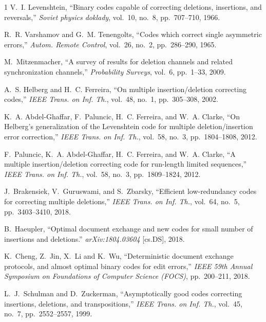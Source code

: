 \documentclass[10pt,a4paper,onecolumn]{IEEEtran}
\newcommand{\1}{\mathbbold{1}}
\begin{document}

\begin{thebibliography}{1}
V.~I. Levenshtein, ``Binary codes capable of correcting deletions, insertions, and reversals,'' \emph{Soviet physics doklady}, vol.~10, no.~8, pp.~707--710, 1966.

R.~R. Varshamov and G.~M. Tenengolts, ``Codes which correct single asymmetric errors,'' \emph{Autom. Remote Control}, vol.~26, no.~2, pp.~286--290, 1965.

M.~Mitzenmacher, ``A survey of results for deletion channels and related synchronization channels,'' \emph{Probability Surveys}, vol.~6, pp.~1--33, 2009.

A.~S. Helberg and H.~C. Ferreira, ``On multiple insertion/deletion correcting codes,'' \emph{IEEE Trans. on Inf. Th.}, vol.~48, no.~1, pp.~305--308, 2002.

K.~A. Abdel-Ghaffar, F.~Paluncic, H.~C. Ferreira, and W.~A. Clarke, ``On Helberg's generalization of the Levenshtein code for multiple deletion/insertion error correction,'' \emph{IEEE Trans. on Inf. Th.}, vol.~58, no.~3, pp.~1804--1808, 2012.



F.~Paluncic, K.~A. Abdel-Ghaffar, H.~C. Ferreira, and W.~A. Clarke, ``A multiple insertion/deletion correcting code for run-length limited sequences,'' \emph{IEEE Trans. on Inf. Th.}, vol.~58, no.~3, pp.~1809--1824, 2012.



J.~Brakensiek, V.~Guruswami, and S.~Zbarsky, ``Efficient low-redundancy codes for correcting multiple deletions,'' \emph{IEEE Trans. on Inf. Th.}, vol.~64, no.~5, pp.~3403--3410, 2018.

B.~Haeupler, ``Optimal document exchange and new codes for small number of insertions and deletions.''  \emph{arXiv:1804.03604} [cs.DS], 2018.

K.~Cheng, Z.~Jin, X.~Li and K.~Wu, ``Deterministic document exchange protocols, and almost optimal binary codes for edit errors,'' \emph{IEEE 59th Annual Symposium on Foundations of Computer Science (FOCS)}, pp.~200--211, 2018.


L.~J.~Schulman and D.~Zuckerman, ``Asymptotically good codes correcting insertions, deletions, and transpositions,'' \emph{IEEE Trans. on Inf. Th.}, vol.~45, no.~7, pp.~2552--2557, 1999.


\end{thebibliography}
\end{document}
